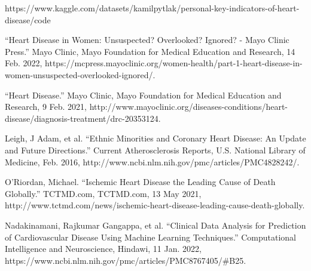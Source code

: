 \documentclass[a4paper]{article}
\begin{document}
\begin{thebibliography}{9}
https://www.kaggle.com/datasets/kamilpytlak/personal-key-indicators-of-heart-disease/code

“Heart Disease in Women: Unsuspected? Overlooked? Ignored? - Mayo Clinic Press.” Mayo Clinic, Mayo Foundation for Medical Education and Research, 14 Feb. 2022, https://mcpress.mayoclinic.org/women-health/part-1-heart-disease-in-women-unsuspected-overlooked-ignored/. 

“Heart Disease.” Mayo Clinic, Mayo Foundation for Medical Education and Research, 9 Feb. 2021, http://www.mayoclinic.org/diseases-conditions/heart-disease/diagnosis-treatment/drc-20353124. 

Leigh, J Adam, et al. “Ethnic Minorities and Coronary Heart Disease: An Update and Future Directions.” Current Atherosclerosis Reports, U.S. National Library of Medicine, Feb. 2016, http://www.ncbi.nlm.nih.gov/pmc/articles/PMC4828242/. 

O'Riordan, Michael. “Ischemic Heart Disease the Leading Cause of Death Globally.” TCTMD.com, TCTMD.com, 13 May 2021, http://www.tctmd.com/news/ischemic-heart-disease-leading-cause-death-globally. 

Nadakinamani, Rajkumar Gangappa, et al. “Clinical Data Analysis for Prediction of Cardiovascular Disease Using Machine Learning Techniques.” Computational Intelligence and Neuroscience, Hindawi, 11 Jan. 2022, https://www.ncbi.nlm.nih.gov/pmc/articles/PMC8767405/\#B25. 

\end{thebibliography}
\end{document}
